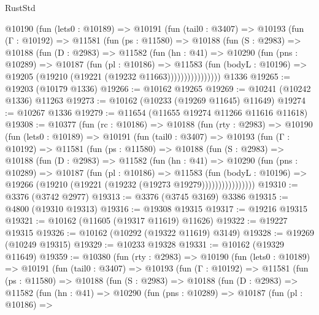 \begin{lexlean}{RustStd}
\begin{coremodule}
        @10190
          (fun (lets0 : @10189) =>
          @10191
            (fun (tail0 : @3407) =>
            @10193
              (fun (Γ : @10192) =>
              @11581
                (fun (ps : @11580) =>
                @10188
                  (fun (S : @2983) =>
                  @10188
                    (fun (D : @2983) =>
                    @11582
                      (fun (hn : @41) =>
                      @10290
                        (fun (pns : @10289) =>
                        @10187
                          (fun (pl : @10186) =>
                          @11583
                            (fun (bodyL : @10196) =>
                            @19205 (@19210 (@19221 (@19232 @11663))))))))))))))))
    @1336
@19265 := @19203 (@10179 @1336)
@19266 := @10162 @19265
@19269 := @10241 (@10242 @1336) @11263
@19273 := @10162 (@10233 (@19269 @11645) @11649)
@19274 := @10267 @1336
@19279 := @11654 (@11655 @19274 @11266 @11616 @11618)
@19308 := @10377
    (fun (rc : @10186) =>
    @10188
      (fun (rty : @2983) =>
      @10190
        (fun (lets0 : @10189) =>
        @10191
          (fun (tail0 : @3407) =>
          @10193
            (fun (Γ : @10192) =>
            @11581
              (fun (ps : @11580) =>
              @10188
                (fun (S : @2983) =>
                @10188
                  (fun (D : @2983) =>
                  @11582
                    (fun (hn : @41) =>
                    @10290
                      (fun (pns : @10289) =>
                      @10187
                        (fun (pl : @10186) =>
                        @11583
                          (fun (bodyL : @10196) =>
                          @19266 (@19210 (@19221 (@19232 (@19273 @19279))))))))))))))))
@19310 := @3376 (@3742 @2977)
@19313 := @3376 (@3745 @3169) @3386
@19315 := @4800 (@19310 @19313)
@19316 := @19308 @19315
@19317 := @19216 @19315
@19321 := @10162 (@11605 (@19317 @11619) @11626)
@19322 := @19227 @19315
@19326 := @10162 (@10292 (@19322 @11619) @3149)
@19328 := @19269 (@10249 @19315)
@19329 := @10233 @19328
@19331 := @10162 (@19329 @11649)
@19359 := @10380
    (fun (rty : @2983) =>
    @10190
      (fun (lets0 : @10189) =>
      @10191
        (fun (tail0 : @3407) =>
        @10193
          (fun (Γ : @10192) =>
          @11581
            (fun (ps : @11580) =>
            @10188
              (fun (S : @2983) =>
              @10188
                (fun (D : @2983) =>
                @11582
                  (fun (hn : @41) =>
                  @10290
                    (fun (pns : @10289) =>
                    @10187
                      (fun (pl : @10186) =>

\end{coremodule}
\end{lexlean}

